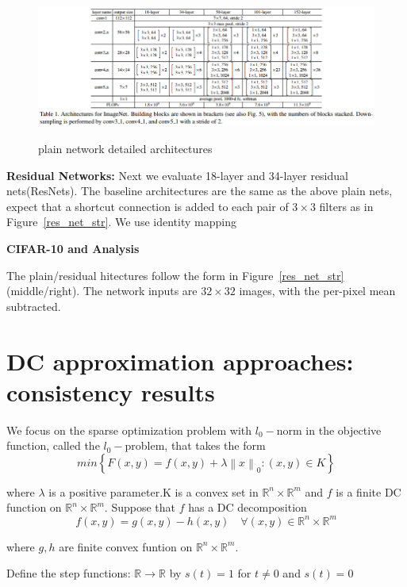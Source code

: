 \documentclass[11pt,en,bibstyle=ieeetr]{elegantpaper}
\begin{document}
\begin{figure}
	\centering
	\caption{plain network detailed architectures}
	\includegraphics[width = 19cm]{fig/architectures.png}
\label{detailed_archi}
\end{figure}

\textbf{Residual Networks:} Next we evaluate 18-layer and 34-layer residual nets(ResNets).
The baseline architectures are the same as the above plain nets, expect that a shortcut connection is added to each pair of $ 3\times 3$ filters as in Figure~\ref{res_net_str}.
We use identity mapping 

\textbf{CIFAR-10 and Analysis}

The plain/residual hitectures follow the form in Figure~\ref{res_net_str} (middle/right). The network inputs are $ 32\times 32 $ images, with the per-pixel mean subtracted.






\section{DC approximation approaches: consistency results}

We focus on the sparse optimization problem with $l_0-$norm in the objective function,
called the $l_0-$problem, that takes the form
\begin{equation}
min \left\{ F(x,y) = f(x,y)+ \lambda \left\| x \right\| _0:(x,y) \in K\right\}
\label{primal_problem}
\end{equation}

where $\lambda $ is a positive parameter.K is a convex set in $\mathbb{R}^{n}\times \mathbb{R}^m$ and $f$  is a finite DC function on  $\mathbb{R}^n \times \mathbb{R}^m$. Suppose that $f$ has a DC decomposition 
$$ f(x,y) = g(x,y) - h(x,y)\quad \forall (x,y) \in \mathbb{R}^n\times \mathbb{R}^m$$    

where $g,h$ are finite convex funtion on $ \mathbb{R}^n \times \mathbb{R}^m$.

Define the step functions: $\mathbb{R} \rightarrow \mathbb{R}$ by $s(t) = 1$ for $t \neq 0$  and $s(t)= 0$ 
\end{document}
